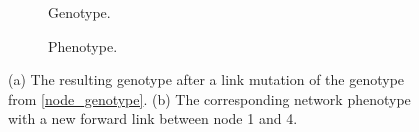 \begin{figure}[htb]
    \begin{mdframed}
        \begin{subfigure}[b]{0.45\textwidth}
            \centering
            \resizebox{1\textwidth}{!}{}
            \caption{Genotype.}
            \label{link_genotype}
        \end{subfigure}
        \begin{subfigure}[b]{0.45\textwidth}
            \centering
            \resizebox{0.65\textwidth}{!}{}
            \caption{Phenotype.}
            \label{link_phenotype}
        \end{subfigure}
    \end{mdframed}
    \caption{ (a) The resulting genotype after a link mutation of the genotype from \ref{node_genotype}. (b) The
    corresponding network phenotype with a new forward link between node 1 and 4.}
    \label{link_mutation}
\end{figure}
